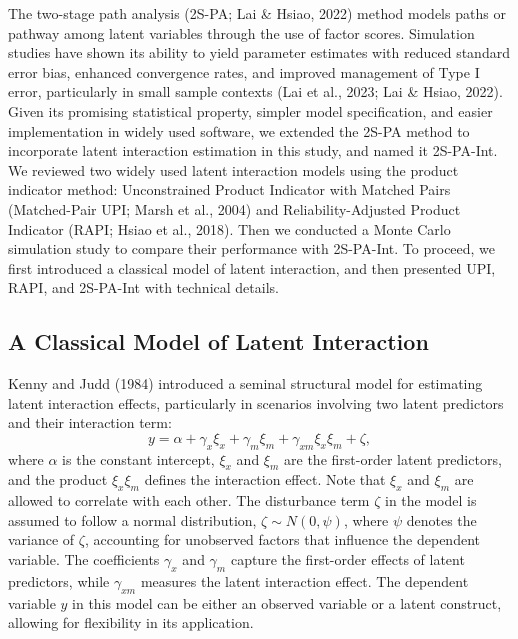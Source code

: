 \documentclass[
  man,mask]{apa6}
\begin{document}
The two-stage path analysis (2S-PA; Lai \& Hsiao, 2022) method models paths or pathway among latent variables through the use of factor scores. Simulation studies have shown its ability to yield parameter estimates with reduced standard error bias, enhanced convergence rates, and improved management of Type I error, particularly in small sample contexts (Lai et al., 2023; Lai \& Hsiao, 2022). Given its promising statistical property, simpler model specification, and easier implementation in widely used software, we extended the 2S-PA method to incorporate latent interaction estimation in this study, and named it 2S-PA-Int. We reviewed two widely used latent interaction models using the product indicator method: Unconstrained Product Indicator with Matched Pairs (Matched-Pair UPI; Marsh et al., 2004) and Reliability-Adjusted Product Indicator (RAPI; Hsiao et al., 2018). Then we conducted a Monte Carlo simulation study to compare their performance with 2S-PA-Int. To proceed, we first introduced a classical model of latent interaction, and then presented UPI, RAPI, and 2S-PA-Int with technical details.

\subsection{A Classical Model of Latent Interaction}\label{a-classical-model-of-latent-interaction}

Kenny and Judd (1984) introduced a seminal structural model for estimating latent interaction effects, particularly in scenarios involving two latent predictors and their interaction term:
\begin{equation}
y = \alpha + \gamma_{x}\xi_{x} + \gamma_{m}\xi_{m} + \gamma_{xm}\xi_{x}\xi_{m} + \zeta,
\end{equation}
where \(\alpha\) is the constant intercept, \(\xi_{x}\) and \(\xi_{m}\) are the first-order latent predictors, and the product \(\xi_{x}\xi_{m}\) defines the interaction effect. Note that \(\xi_{x}\) and \(\xi_{m}\) are allowed to correlate with each other. The disturbance term \(\zeta\) in the model is assumed to follow a normal distribution, \(\zeta \sim N(0, \psi)\), where \(\psi\) denotes the variance of \(\zeta\), accounting for unobserved factors that influence the dependent variable. The coefficients \(\gamma_{x}\) and \(\gamma_{m}\) capture the first-order effects of latent predictors, while \(\gamma_{xm}\) measures the latent interaction effect. The dependent variable \(y\) in this model can be either an observed variable or a latent construct, allowing for flexibility in its application.
\end{document}
